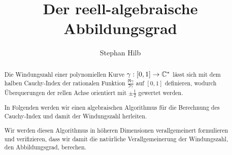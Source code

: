 \documentclass{mythesis}
\title{Der reell-algebraische Abbildungsgrad}
\author{Stephan Hilb}
\begin{document}
\maketitle

\begin{abstract}
    Die Windungszahl einer polynomiellen Kurve $\gamma: [0, 1] \to \mathbb { C }^*$ lässt sich mit dem halben Cauchy-Index der rationalen Funktion $\frac{\Re \gamma}{\Im \gamma}$ auf $[0,1]$ definieren, wodurch Überquerungen der rellen Achse orientiert mit $\pm \frac{1}{2}$ gewertet werden.

    In Folgenden werden wir einen algebraischen Algorithmus für die Berechnung des Cauchy-Index und damit der Windungszahl herleiten.

    Wir werden diesen Algorithmus in höheren Dimensionen verallgemeinert formulieren und verifizieren, dass wir damit die natürliche Verallgemeinerung der Windungszahl, den Abbildungsgrad, berechen.
\end{abstract}
\end{document}
